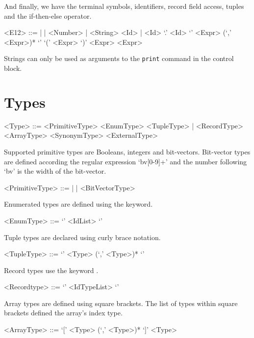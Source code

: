 And finally, we have the terminal symbols, identifiers, record field access, tuples and the if-then-else operator.
\begin{grammar}
    <E12> ::=  |  | <Number> | <String>
          \alt <Id> | <Id> `.' <Id>
          \alt `{' <Expr> (`,' <Expr>)* `}'
          \alt {} `(' <Expr> `)'  <Expr>  <Expr>
\end{grammar}

Strings can only be used as arguments to the \texttt{print} command in the control block.

\section{Types}

\begin{grammar}
<Type> ::= <PrimitiveType> 
       \alt <EnumType> 
       \alt <TupleType> | <RecordType> 
       \alt <ArrayType> 
       \alt <SynonymType> 
       \alt <ExternalType> 
\end{grammar}

Supported primitive types are Booleans, integers and bit-vectors. Bit-vector types are defined according the regular expression `bv[0-9]+' and the number following `bv' is the width of the bit-vector.

\begin{grammar}
    <PrimitiveType> ::=  |  | <BitVectorType>
\end{grammar}

Enumerated types are defined using the  keyword.
\begin{grammar}
    <EnumType> ::=  `{' <IdList> `}'
\end{grammar}

Tuple types are declared using curly brace notation.
\begin{grammar}
    <TupleType> ::= `{' <Type>  (`,' <Type>)* `}'
\end{grammar}

Record types use the keyword .
\begin{grammar}
    <Recordtype> ::=  `{' <IdTypeList> `}'
\end{grammar}

Array types are defined using square brackets. The list of types within square brackets defined the array's index type.
\begin{grammar}
    <ArrayType> ::= `[' <Type> (`,' <Type>)* `]' <Type>
\end{grammar}


